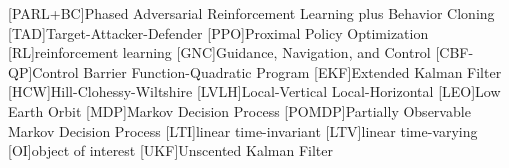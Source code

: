 \begin{acronym}[PARL+BC]
    [PARL+BC]{Phased Adversarial Reinforcement Learning plus Behavior Cloning}
    [TAD]{Target-Attacker-Defender}
    [PPO]{Proximal Policy Optimization}
    [RL]{reinforcement learning}
    [GNC]{Guidance, Navigation, and Control}
    [CBF-QP]{Control Barrier Function-Quadratic Program}
    [EKF]{Extended Kalman Filter}
    [HCW]{Hill-Clohessy-Wiltshire}
    [LVLH]{Local-Vertical Local-Horizontal}
    [LEO]{Low Earth Orbit}
    [MDP]{Markov Decision Process}
    [POMDP]{Partially Observable Markov Decision Process}
    [LTI]{linear time-invariant}
    [LTV]{linear time-varying}
    [OI]{object of interest}
    [UKF]{Unscented Kalman Filter}
\end{acronym}
